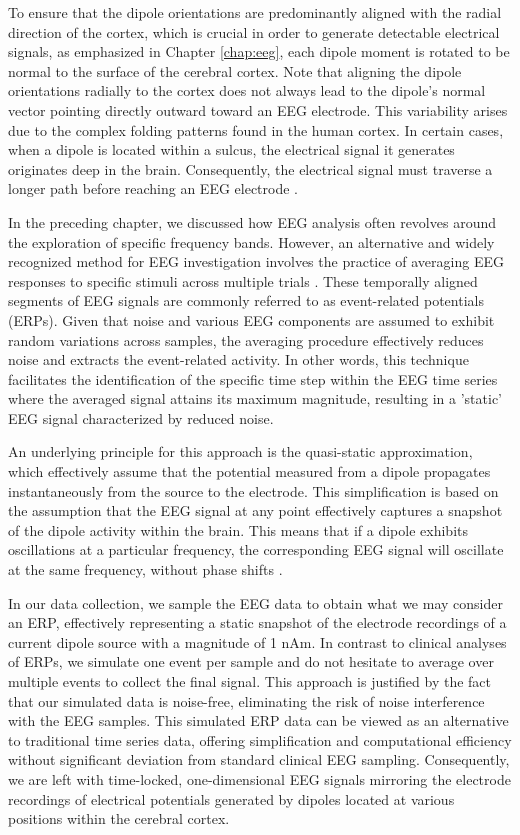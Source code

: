\documentclass[a4paper, UKenglish, 11pt]{uiomaster}
\begin{document}
To ensure that the dipole orientations are predominantly aligned with the radial direction of the cortex, which is crucial in order to generate detectable electrical signals, as emphasized in Chapter \ref{chap:eeg}, each dipole moment is rotated to be normal to the surface of the cerebral cortex. Note that aligning the dipole orientations radially to the cortex does not always lead to the dipole's normal vector pointing directly outward toward an EEG electrode. This variability arises due to the complex folding patterns found in the human cortex. In certain cases, when a dipole is located within a sulcus, the electrical signal it generates originates deep in the brain. Consequently, the electrical signal must traverse a longer path before reaching an EEG electrode \cite{naess2021biophysically}.

In the preceding chapter, we discussed how EEG analysis often revolves around the exploration of specific frequency bands. However, an alternative and widely recognized method for EEG investigation involves the practice of averaging EEG responses to specific stimuli across multiple trials \cite{kropotov2016functional}. These temporally aligned segments of EEG signals are commonly referred to as event-related potentials (ERPs). Given that noise and various EEG components are assumed to exhibit random variations across samples, the averaging procedure effectively reduces noise and extracts the event-related activity. In other words, this technique facilitates the identification of the specific time step within the EEG time series where the averaged signal attains its maximum magnitude, resulting in a 'static' EEG signal characterized by reduced noise.

An underlying principle for this approach is the quasi-static approximation, which effectively assume that the potential measured from a dipole propagates instantaneously from the source to the electrode. This simplification is based on the assumption that the EEG signal at any point effectively captures a snapshot of the dipole activity within the brain. This means that if a dipole exhibits oscillations at a particular frequency, the corresponding EEG signal will oscillate at the same frequency, without phase shifts \cite{Ness2022}.

In our data collection, we sample the EEG data to obtain what we may consider an ERP, effectively representing a static snapshot of the electrode recordings of a current dipole source with a magnitude of 1 nAm. In contrast to clinical analyses of ERPs, we simulate one event per sample and do not hesitate to average over multiple events to collect the final signal. This approach is justified by the fact that our simulated data is noise-free, eliminating the risk of noise interference with the EEG samples. This simulated ERP data can be viewed as an alternative to traditional time series data, offering simplification and computational efficiency without significant deviation from standard clinical EEG sampling. Consequently, we are left with time-locked, one-dimensional EEG signals mirroring the electrode recordings of electrical potentials generated by dipoles located at various positions within the cerebral cortex.
\end{document}
